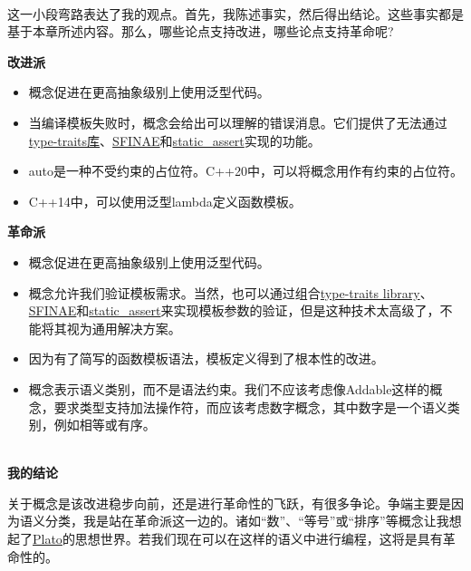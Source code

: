\hspace*{\fill} \\ %
\begin{tcolorbox}[breakable,enhanced jigsaw,colback=blue!5!white,colframe=blue!75!black,title={常规类型}]

这一小段弯路表达了我的观点。首先，我陈述事实，然后得出结论。这些事实都是基于本章所述内容。那么，哪些论点支持改进，哪些论点支持革命呢?

\noindent
\textbf{改进派}

\begin{itemize}
\item 
概念促进在更高抽象级别上使用泛型代码。

\item 
当编译模板失败时，概念会给出可以理解的错误消息。它们提供了无法通过\href{https://en.cppreference.com/w/cpp/header/type_traits}{type-traits库}、\href{https://en.cppreference.com/w/cpp/language/sfinae}{SFINAE}和\href{https://en.cppreference.com/w/cpp/language/static_assert}{static\_assert}实现的功能。

\item 
auto是一种不受约束的占位符。C++20中，可以将概念用作有约束的占位符。

\item 
C++14中，可以使用泛型lambda定义函数模板。
\end{itemize}

\noindent
\textbf{革命派}

\begin{itemize}
\item 
概念促进在更高抽象级别上使用泛型代码。

\item 
概念允许我们验证模板需求。当然，也可以通过组合\href{https://en.cppreference.com/w/cpp/header/type_traits}{type-traits library}、\href{https://en.cppreference.com/w/cpp/language/sfinae}{SFINAE}和\href{https://en.cppreference.com/w/cpp/language/static_assert}{static\_assert}来实现模板参数的验证，但是这种技术太高级了，不能将其视为通用解决方案。

\item 
因为有了简写的函数模板语法，模板定义得到了根本性的改进。

\item 
概念表示语义类别，而不是语法约束。我们不应该考虑像Addable这样的概念，要求类型支持加法操作符，而应该考虑数字概念，其中数字是一个语义类别，例如相等或有序。
\end{itemize}

\hspace*{\fill} \\ %
\noindent
\textbf{我的结论}

关于概念是该改进稳步向前，还是进行革命性的飞跃，有很多争论。争端主要是因为语义分类，我是站在革命派这一边的。诸如“数”、“等号”或“排序”等概念让我想起了\href{https://en.wikipedia.org/wiki/Plato}{Plato}的思想世界。若我们现在可以在这样的语义中进行编程，这将是具有革命性的。
\end{tcolorbox}

